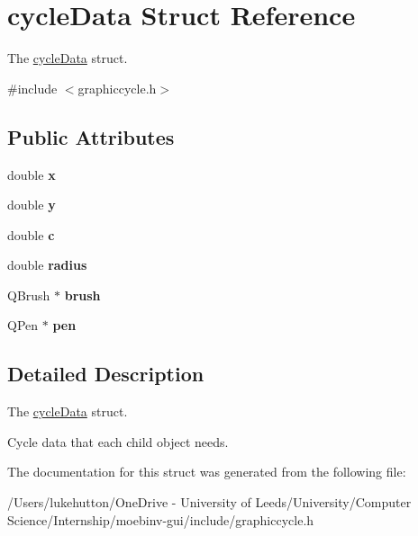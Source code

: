 \hypertarget{structcycle_data}{}\section{cycle\+Data Struct Reference}
\label{structcycle_data}


The \mbox{\hyperlink{structcycle_data}{cycle\+Data}} struct.  




{\ttfamily \#include $<$graphiccycle.\+h$>$}

\subsection*{Public Attributes}
\begin{DoxyCompactItemize}
\item 
\mbox{\label{structcycle_data_a5196a89f9438dfe6aeca79b20b1365dc}} 
double {\bfseries x}
\item 
\mbox{\label{structcycle_data_a943d9aa23035ec42edfaf4f2c6d57095}} 
double {\bfseries y}
\item 
\mbox{\label{structcycle_data_a696c13341d3fee420edacff5630ff797}} 
double {\bfseries c}
\item 
\mbox{\label{structcycle_data_a815e7bc546bb425f638be27cb805315d}} 
double {\bfseries radius}
\item 
\mbox{\label{structcycle_data_aea3d22bf8556ff483f19a00ffa646a13}} 
Q\+Brush $\ast$ {\bfseries brush}
\item 
\mbox{\label{structcycle_data_a90e5dc6feb2c6486251d339394810d9b}} 
Q\+Pen $\ast$ {\bfseries pen}
\end{DoxyCompactItemize}


\subsection{Detailed Description}
The \mbox{\hyperlink{structcycle_data}{cycle\+Data}} struct. 

Cycle data that each child object needs. 

The documentation for this struct was generated from the following file\+:\begin{DoxyCompactItemize}
\item 
/\+Users/lukehutton/\+One\+Drive -\/ University of Leeds/\+University/\+Computer Science/\+Internship/moebinv-\/gui/include/graphiccycle.\+h\end{DoxyCompactItemize}
